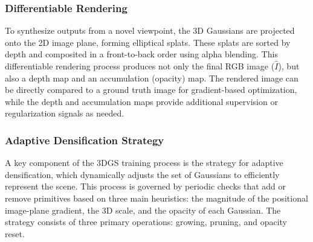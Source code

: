 \subsubsection{Differentiable Rendering}
To synthesize outputs from a novel viewpoint, the 3D Gaussians are projected onto the 2D image plane, forming elliptical splats. These splats are sorted by depth and composited in a front-to-back order using alpha blending. This differentiable rendering process produces not only the final RGB image ($\hat{I}$), but also a depth map and an accumulation (opacity) map. The rendered image can be directly compared to a ground truth image for gradient-based optimization, while the depth and accumulation maps provide additional supervision or regularization signals as needed.

\subsubsection{Adaptive Densification Strategy}
A key component of the 3DGS training process is the strategy for adaptive densification, which dynamically adjusts the set of Gaussians to efficiently represent the scene. This process is governed by periodic checks that add or remove primitives based on three main heuristics: the magnitude of the positional image-plane gradient, the 3D scale, and the opacity of each Gaussian. The strategy consists of three primary operations: growing, pruning, and opacity reset.

